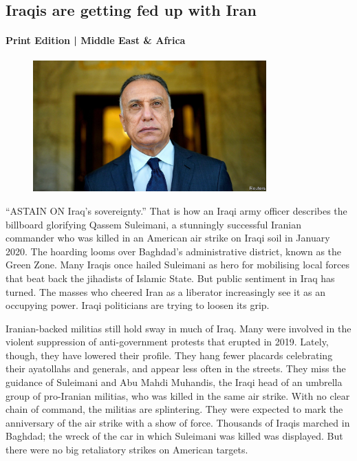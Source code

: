 \documentclass{article}
\begin{document}
\subsection{Iraqis are getting fed up with Iran }
\paragraph{Print Edition | Middle East \& Africa  \quad \color{gray}{Mar 27th 2021 }}
\begin{figure}[h]
\centering
\includegraphics[width=0.8\textwidth]{images/20210327_map505.jpg}
\end{figure}
\lettrine{``A} STAIN ON Iraq's sovereignty.'' That is how an Iraqi army officer describes the billboard glorifying Qassem Suleimani, a stunningly successful Iranian commander who was killed in an American air strike on Iraqi soil in January 2020. The hoarding looms over Baghdad's administrative district, known as the Green Zone. Many Iraqis once hailed Suleimani as hero for mobilising local forces that beat back the jihadists of Islamic State. But public sentiment in Iraq has turned. The masses who cheered Iran as a liberator increasingly see it as an occupying power. Iraqi politicians are trying to loosen its grip. 

Iranian-backed militias still hold sway in much of Iraq. Many were involved in the violent suppression of anti-government protests that erupted in 2019. Lately, though, they have lowered their profile. They hang fewer placards celebrating their ayatollahs and generals, and appear less often in the streets. They miss the guidance of Suleimani and Abu Mahdi Muhandis, the Iraqi head of an umbrella group of pro-Iranian militias, who was killed in the same air strike. With no clear chain of command, the militias are splintering. They were expected to mark the anniversary of the air strike with a show of force. Thousands of Iraqis marched in Baghdad; the wreck of the car in which Suleimani was killed was displayed. But there were no big retaliatory strikes on American targets. 
\end{document}
